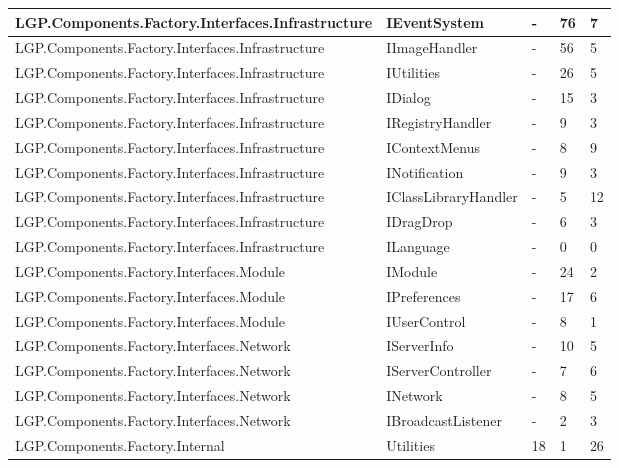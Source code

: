 \begin{table}[h!t]
{\begin{tabular}{ | p{82mm} | p{32mm} | p{10mm} | p{10mm} | p{10mm} | }
				LGP.Components.Factory.Interfaces.Infrastructure & IEventSystem & -     & \cellcolor{ored}76    & 7  \\ \hline
				LGP.Components.Factory.Interfaces.Infrastructure & IImageHandler & -     & \cellcolor{ored}56    & 5  \\ \hline
				LGP.Components.Factory.Interfaces.Infrastructure & IUtilities & -     & \cellcolor{ored}26    & 5  \\ \hline
				LGP.Components.Factory.Interfaces.Infrastructure & IDialog & -     & \cellcolor{ored}15    & 3  \\ \hline
				LGP.Components.Factory.Interfaces.Infrastructure & IRegistryHandler & -     & \cellcolor{ored}9     & 3  \\ \hline
				LGP.Components.Factory.Interfaces.Infrastructure & IContextMenus & -     & \cellcolor{ored}8     & 9  \\ \hline
				LGP.Components.Factory.Interfaces.Infrastructure & INotification & -     & \cellcolor{ored}9     & 3  \\ \hline
				LGP.Components.Factory.Interfaces.Infrastructure & IClassLibraryHandler & -     & 5     & 12  \\ \hline
				LGP.Components.Factory.Interfaces.Infrastructure & IDragDrop & -     & 6     & 3  \\ \hline
				LGP.Components.Factory.Interfaces.Infrastructure & ILanguage & -     & 0     & 0  \\ \hline
				LGP.Components.Factory.Interfaces.Module & IModule & -     & \cellcolor{ored}24    & 2  \\ \hline
				LGP.Components.Factory.Interfaces.Module & IPreferences & -     & \cellcolor{ored}17    & 6  \\ \hline
				LGP.Components.Factory.Interfaces.Module & IUserControl & -     & \cellcolor{ored}8     & 1  \\ \hline
				LGP.Components.Factory.Interfaces.Network & IServerInfo & -     & \cellcolor{ored}10    & 5  \\ \hline
				LGP.Components.Factory.Interfaces.Network & IServerController & -     & 7     & 6  \\ \hline
				LGP.Components.Factory.Interfaces.Network & INetwork & -     & \cellcolor{ored}8     & 5  \\ \hline
				LGP.Components.Factory.Interfaces.Network & IBroadcastListener & -     & 2     & 3  \\ \hline
				LGP.Components.Factory.Internal & Utilities & 18    & 1     & 26  \\ \hline

\end{tabular}}
\end{table}
